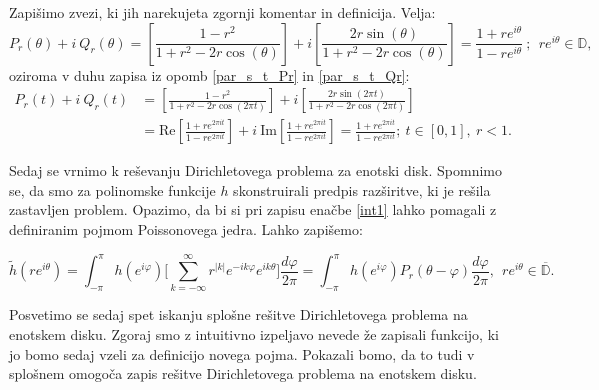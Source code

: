 \documentclass[mat1]{fmfdelo}
\begin{document}
    \begin{opomba}
        Zapišimo zvezi, ki jih narekujeta zgornji komentar in definicija. Velja:
        $$
        P_r(\theta) + i~Q_r(\theta) = \left[ \frac{1-r^2}{1+ r^2 - 2r \cos(\theta)}\right] + i \left[\frac{2 r \sin(\theta)}{1+ r^2 - 2r \cos(\theta)}\right] = \frac{1 + re^{i\theta}}{1 - re^{i\theta}}~;~~r e^{i\theta} \in \mathbb{D}, 
        $$
        oziroma v duhu zapisa iz opomb \ref{par_s_t_Pr} in \ref{par_s_t_Qr}:
        \begin{align*}
            P_r(t) + i~Q_r(t) &= \left[ \frac{1-r^2}{1+ r^2 - 2r \cos(2 \pi t)}\right] + i \left[\frac{2 r \sin(2 \pi t)}{1+ r^2 - 2r \cos(2 \pi t)}\right] \\ 
            &=  \text{Re}\left[\frac{1 + re^{2 \pi i t}}{1 - re^{2 \pi i t}}\right] + i~\text{Im}\left[\frac{1 + re^{2 \pi i t}}{1 - re^{2 \pi i t}}\right]=\frac{1 + re^{2 \pi i t}}{1 - re^{2 \pi i t}};~t\in [0, 1], ~ r < 1.
        \end{align*}        
    \end{opomba}

    Sedaj se vrnimo k reševanju Dirichletovega problema za enotski disk. 
    Spomnimo se, da smo za polinomske funkcije $h$ skonstruirali predpis razširitve, ki je rešila zastavljen problem. 
    Opazimo, da bi si pri zapisu enačbe \eqref{int1} lahko pomagali z definiranim pojmom Poissonovega jedra. Lahko zapišemo:
    
    $$
    \widetilde{h}(r e^{i \theta}) = \int_{-\pi}^{\pi}{h(e^{i \varphi}) \bigg[\sum_{k = - \infty}^{\infty} r^{|k|} e^{- i k \varphi} e^{i k \theta}} \bigg]\frac{d \varphi}{2 \pi} = 
    \int_{-\pi}^{\pi}{h(e^{i \varphi}) P_r(\theta - \varphi)\frac{d \varphi}{2 \pi}},~~r e^{i \theta} \in \overline{\mathbb{D}}.
    $$
    
    Posvetimo se sedaj spet iskanju splošne rešitve Dirichletovega problema na enotskem disku. Zgoraj smo z intuitivno izpeljavo nevede že zapisali funkcijo, ki jo bomo sedaj vzeli za definicijo novega pojma. 
    Pokazali bomo, da to tudi v splošnem omogoča zapis rešitve Dirichletovega problema na enotskem disku.
\end{document}
